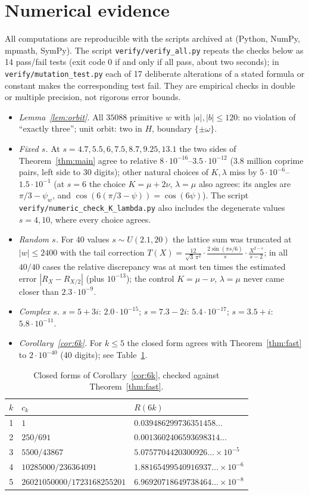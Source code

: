 \documentclass[11pt]{article}
\theoremstyle{remark}
\begin{document}
\section{Numerical evidence}
All computations are reproducible with the scripts archived at \cite{Z} (Python, NumPy, mpmath, SymPy). The script
\texttt{verify/verify\_all.py} repeats the checks below as 14 pass/fail tests (exit code $0$ if and only if all pass, about two
seconds); in \texttt{verify/mutation\_test.py} each of 17 deliberate alterations of a stated formula or constant makes the
corresponding test fail.
They are empirical checks in double or multiple precision, not rigorous error bounds.
\begin{itemize}
\item \emph{Lemma~\ref{lem:orbit}.} All $35088$ primitive $w$ with $|a|,|b|\le120$: no violation of ``exactly three''; unit orbit:
two in $H$, boundary $\{\pm\omega\}$.
\item \emph{Fixed $s$.} At $s=4.7,5.5,6,7.5,8.7,9.25,13.1$ the two sides of Theorem~\ref{thm:main} agree to relative
$8\cdot10^{-16}$--$3.5\cdot10^{-12}$ ($3.8$ million coprime pairs, left side to 30 digits); other natural choices of $K,\lambda$ miss by
$5\cdot10^{-6}$--$1.5\cdot10^{-1}$ (at $s=6$ the choice $K=\mu+2\nu$, $\lambda=\mu$ also agrees: its angles are $\pi/3-\psi_w$, and $\cos(6(\pi/3-\psi))=\cos(6\psi)$). The script \texttt{verify/numeric\_check\_K\_lambda.py} also includes the degenerate values $s=4,10$, where every choice agrees.
\item \emph{Random $s$.} For 40 values $s\sim U(2.1,20)$ the lattice sum was truncated at $|w|\le2400$ with the tail correction
$T(X)=\frac{12}{\sqrt3\,\pi^2}\cdot\frac{2\sin(\pi s/6)}{s}\cdot\frac{X^{2-s}}{s-2}$; in all $40/40$ cases the relative discrepancy was at most
ten times the estimated error $|R_X-R_{X/2}|$ (plus $10^{-13}$); the control $K=\mu-\nu$, $\lambda=\mu$ never came closer than $2.3\cdot10^{-9}$.
\item \emph{Complex $s$.} $s=5+3i$: $2.0\cdot10^{-15}$; $s=7.3-2i$: $5.4\cdot10^{-17}$; $s=3.5+i$: $5.8\cdot10^{-11}$.
\item \emph{Corollary~\ref{cor:6k}.} For $k\le5$ the closed form agrees with Theorem~\ref{thm:fast} to $2\cdot10^{-40}$ (40 digits); see Table~\ref{tab:R6k}.
\end{itemize}
\begin{table}[h]\centering
\begin{tabular}{rll}\toprule
$k$ & $c_k$ & $R(6k)$\\\midrule
1 & $1$ & $0.039486299736351458\ldots$\\
2 & $250/691$ & $0.0013602406593698314\ldots$\\
3 & $5500/43867$ & $5.0757704420300926\ldots\times10^{-5}$\\
4 & $10285000/236364091$ & $1.88165499540916937\ldots\times10^{-6}$\\
5 & $26021050000/1723168255201$ & $6.96920718649738464\ldots\times10^{-8}$\\\bottomrule
\end{tabular}
\caption{Closed forms of Corollary~\ref{cor:6k}, checked against Theorem~\ref{thm:fast}.}\label{tab:R6k}
\end{table}
\end{document}
